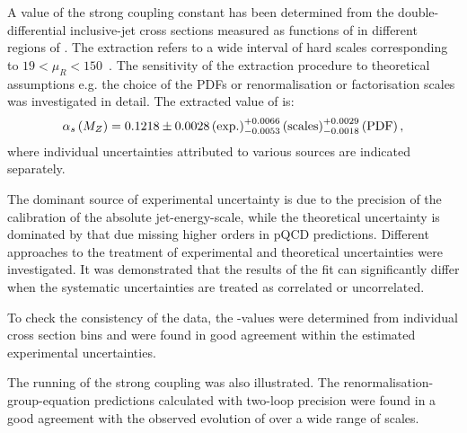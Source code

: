 A value of the strong coupling constant has been determined from the double-differential inclusive-jet cross sections measured as functions of \etjetb in different regions of \qsq. The extraction refers to a wide interval of hard scales corresponding to $19 < \mu_R < 150$~\GeV. The sensitivity of the extraction procedure to theoretical assumptions e.g. the choice of the PDFs or renormalisation or factorisation scales was investigated in detail. The extracted value of \asz is:
\begin{equation}
 \mbox{$\alpha_{s}\left(M_{Z}\right)$} = 0.1218 \pm 0.0028\left(\text{exp.}\right)^{+0.0066}_{-0.0053}\left(\text{scales}\right)^{+0.0029}_{-0.0018}\left(\text{PDF}\right),
\end{equation}
where individual uncertainties attributed to various sources are indicated separately. 

The dominant source of experimental uncertainty is due to the precision of the calibration of the absolute jet-energy-scale, while the theoretical uncertainty is dominated by that due missing higher orders in pQCD predictions.
Different approaches to the treatment of experimental and theoretical uncertainties were investigated. It was demonstrated that the results of the fit can significantly differ when the systematic uncertainties are treated as correlated or uncorrelated. 

To check the consistency of the data, the \asz-values were determined from individual cross section bins and were found in good agreement within the estimated experimental uncertainties.

The running of the strong coupling was also illustrated. The renormalisation-group-equation predictions calculated with two-loop precision were found in a good agreement with the observed evolution of \as over a wide range of scales.
